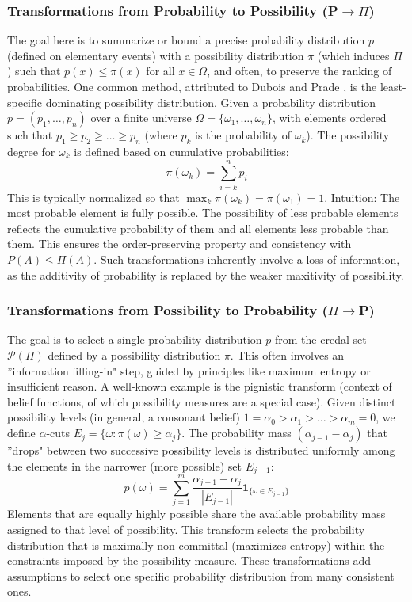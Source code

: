 \subsubsection{Transformations from Probability to Possibility (P$\to\Pi$)}
The goal here is to summarize or bound a precise probability distribution $p$ (defined on elementary events) with a possibility distribution $\pi$ (which induces $\Pi$) such that $p(x) \le \pi(x)$ for all $x \in \Omega$, and often, to preserve the ranking of probabilities.
One common method, attributed to Dubois and Prade \cite{Dubois1997}, is the least-specific dominating possibility distribution.
Given a probability distribution $p=(p_1, \dots, p_n)$ over a finite universe $\Omega = \{\omega_1, \dots, \omega_n\}$, with elements ordered such that $p_1 \ge p_2 \ge \dots \ge p_n$ (where $p_k$ is the probability of $\omega_k$). The possibility degree for $\omega_k$ is defined based on cumulative probabilities:
\[ \pi(\omega_k) = \sum_{i=k}^{n} p_i \]
This is typically normalized so that $\max_k \pi(\omega_k) = \pi(\omega_1) = 1$.
Intuition: The most probable element is fully possible. The possibility of less probable elements reflects the cumulative probability of them and all elements less probable than them. This ensures the order-preserving property and consistency with $P(A) \le \Pi(A)$. Such transformations inherently involve a loss of information, as the additivity of probability is replaced by the weaker maxitivity of possibility.

\subsubsection{Transformations from Possibility to Probability ($\Pi\to$P)}
The goal is to select a single probability distribution $p$ from the credal set $\mathcal{P}(\Pi)$ defined by a possibility distribution $\pi$. This often involves an ''information filling-in" step, guided by principles like maximum entropy or insufficient reason.
A well-known example is the pignistic transform (context of belief functions, of which possibility measures are a special case). Given distinct possibility levels (in general, a consonant belief) $1 = \alpha_0 > \alpha_1 > \dots > \alpha_m = 0$, we define $\alpha$-cuts $E_j = \{\omega : \pi(\omega) \ge \alpha_j\}$. The probability mass $(\alpha_{j-1} - \alpha_j)$ that ''drops" between two successive possibility levels is distributed uniformly among the elements in the narrower (more possible) set $E_{j-1}$:
\[ p(\omega) = \sum_{j=1}^{m} \frac{\alpha_{j-1} - \alpha_j}{|E_{j-1}|} \mathbf{1}_{\{\omega \in E_{j-1}\}} \]
Elements that are equally highly possible share the available probability mass assigned to that level of possibility. This transform selects the probability distribution that is maximally non-committal (maximizes entropy) within the constraints imposed by the possibility measure. These transformations add assumptions to select one specific probability distribution from many consistent ones.

